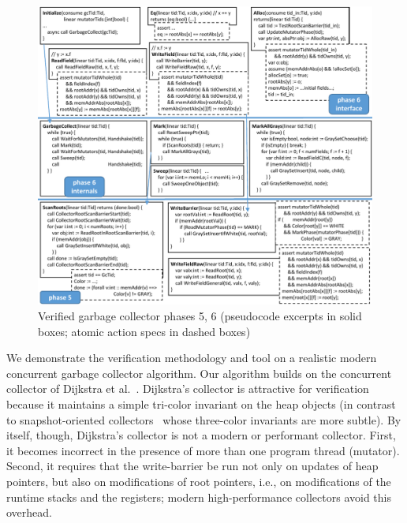 \begin{figure}
\includegraphics[scale=1.0]{VerifiedGC.pdf}
\caption{Verified garbage collector phases 5, 6 (pseudocode excerpts in solid boxes; atomic action specs in dashed boxes)}
\label{fig:VerifiedGC}
\end{figure}

We demonstrate the verification methodology and tool on a realistic modern concurrent garbage collector algorithm.
Our algorithm builds on the concurrent collector of Dijkstra et al.~\cite{dijk78}.
Dijkstra's collector is attractive for verification because it maintains a simple tri-color invariant
on the heap objects (in contrast to snapshot-oriented collectors~\cite{doli93,doli94,doma00,azat03}
whose three-color invariants are more subtle).
By itself, though, Dijkstra's collector is not a modern or performant collector.
First, it becomes incorrect in the presence of more than one program thread (mutator).
Second, it requires that the write-barrier be run not only on updates of heap pointers,
but also on modifications of root pointers, i.e., on modifications of the runtime stacks and the registers;
modern high-performance collectors avoid this overhead.


